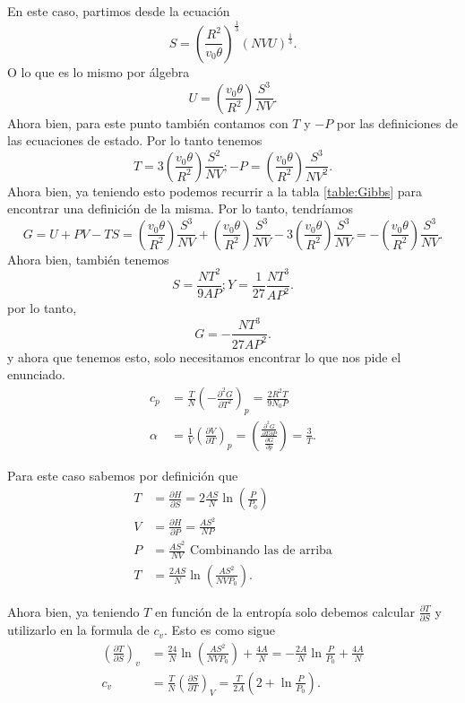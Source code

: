 \documentclass{report}
\begin{document}
En este caso, partimos desde la ecuación \[
  S=\left( \frac{R^2}{v_0\theta} \right)^{\frac{1}{3}}\left( NVU \right)^{\frac{1}{3}}
.\] O lo que es lo mismo por álgebra \[
U=\left( \frac{v_0\theta}{R^2} \right) \frac{S^3}{NV}
.\] Ahora bien, para este punto también contamos con $T$ y $-P$ por las definiciones de las ecuaciones de estado. Por lo tanto tenemos \[
T=3\left( \frac{v_0\theta}{R^2} \right) \frac{S^2}{NV} ; -P=\left( \frac{v_0\theta}{R^2} \right) \frac{S^3}{NV^2}
.\]  Ahora bien, ya teniendo esto podemos recurrir a la tabla \ref{table:Gibbs} para encontrar una definición de la misma. Por lo tanto, tendríamos \[
G=U+PV-TS=\left( \frac{v_0\theta}{R^2} \right)\frac{S^3}{NV}+\left( \frac{v_0\theta}{R^2} \right)\frac{S^3}{NV}-3\left( \frac{v_0\theta}{R^2} \right)\frac{S^3}{NV}=-\left( \frac{v_0\theta}{R^2} \right)\frac{S^3}{NV}
.\]Ahora bien, también tenemos \[
S=\frac{NT^2}{9AP} ; Y=\frac{1}{27}\frac{NT^3}{AP^2}
.\]  por lo tanto, \[
G=-\frac{NT^3}{27AP^2}
.\] y ahora que tenemos esto, solo necesitamos encontrar lo que nos pide el enunciado.
\begin{align*}
  c_p&= \frac{T}{N}\left( -\frac{\partial^2 G}{\partial T^2} \right)_p = \frac{2R^2T}{9N_0P} \\
  \alpha &= \frac{1}{V}\left( \frac{\partial V}{\partial T} \right)_p = \left( \frac{\frac{\partial^2 G}{\partial T \partial P}}{\frac{\partial G}{\partial p}} \right) = \frac{3}{T}
.\end{align*}


\sol

Para este caso sabemos por definición que
\begin{align*}
  T&= \frac{\partial H}{\partial S}=2 \frac{AS}{N}\ln\left( \frac{P}{P_0} \right)  \\
  V&= \frac{\partial H}{\partial P}=\frac{AS^2}{NP} \\
  P&= \frac{AS^2}{NV} \text{ Combinando las de arriba} \\
  T&= \frac{2AS}{N}\ln\left( \frac{AS^2}{NVP_0} \right)
.\end{align*}

Ahora bien, ya teniendo $T$ en función de la entropía solo debemos calcular $\frac{\partial T}{\partial S}$ y utilizarlo en la formula de $c_v$. Esto es como sigue
\begin{align*}
\left( \frac{\partial T}{\partial S} \right)_v &= \frac{24}{N}\ln\left( \frac{AS^2}{NVP_0} \right) + \frac{4A}{N}=-\frac{2A}{N}\ln \frac{P}{P_0}+\frac{4A}{N} \\
c_v &= \frac{T}{N}\left( \frac{\partial S}{\partial T} \right)_V = \frac{T}{2A}\left( 2+\ln \frac{P}{P_0} \right) 
.\end{align*}
\end{document}
